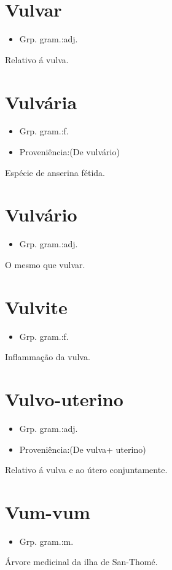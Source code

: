 \documentclass{article}
\begin{document}
\section{Vulvar}
\begin{itemize}
\item {Grp. gram.:adj.}
\end{itemize}
Relativo á vulva.
\section{Vulvária}
\begin{itemize}
\item {Grp. gram.:f.}
\end{itemize}
\begin{itemize}
\item {Proveniência:(De \textunderscore vulvário\textunderscore )}
\end{itemize}
Espécie de anserina fétida.
\section{Vulvário}
\begin{itemize}
\item {Grp. gram.:adj.}
\end{itemize}
O mesmo que \textunderscore vulvar\textunderscore .
\section{Vulvite}
\begin{itemize}
\item {Grp. gram.:f.}
\end{itemize}
Inflammação da vulva.
\section{Vulvo-uterino}
\begin{itemize}
\item {Grp. gram.:adj.}
\end{itemize}
\begin{itemize}
\item {Proveniência:(De \textunderscore vulva\textunderscore  + \textunderscore uterino\textunderscore )}
\end{itemize}
Relativo á vulva e ao útero conjuntamente.
\section{Vum-vum}
\begin{itemize}
\item {Grp. gram.:m.}
\end{itemize}
Árvore medicinal da ilha de San-Thomé.
\end{document}
